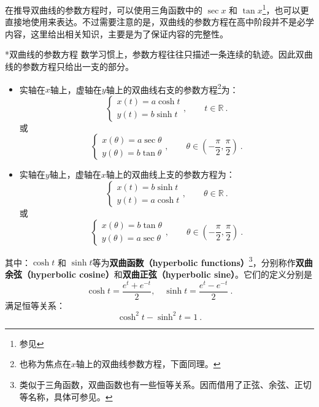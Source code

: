 在推导双曲线的参数方程时，可以使用三角函数中的 $\sec x$ 和 $\tan x$\footnote{参见}，也可以更直接地使用来表达。不过需要注意的是，双曲线的参数方程在高中阶段并不是必学内容，这里给出相关知识，主要是为了保证内容的完整性。

\begin{theorem}{*双曲线的参数方程}
数学习惯上，参数方程往往只描述一条连续的轨迹。因此双曲线的参数方程只给出一支的部分。
\begin{itemize}
\item 实轴在$x$轴上，虚轴在$y$轴上的双曲线右支的参数方程\footnote{也称为焦点在$x$轴上的双曲线参数方程，下面同理。}为：
\begin{equation}
\begin{cases}
x(t) = a \cosh t\\
y(t) = b \sinh t
\end{cases},\qquad t\in \mathbb{R} ~.
\end{equation}
或
\begin{equation}
\begin{cases}
x(\theta)=a\sec{\theta}\\
y(\theta)=b\tan{\theta}
\end{cases},\qquad \theta \in \left( -\frac{\pi}{2}, \frac{\pi}{2} \right) ~.
\end{equation}

\item 实轴在$y$轴上，虚轴在$x$轴上的双曲线上支的参数方程为：
\begin{equation}
\begin{cases}
x(t) = b \sinh t\\
y(t) = a \cosh t
\end{cases},\qquad \theta\in \mathbb{R} ~.
\end{equation}
或
\begin{equation}
\begin{cases}
x(\theta) = b \tan \theta\\
y(\theta) = a \sec \theta
\end{cases},\qquad \theta \in \left( -\frac{\pi}{2}, \frac{\pi}{2} \right) ~.
\end{equation}
\end{itemize}
其中：$\cosh t$ 和 $\sinh t$等为\textbf{双曲函数（hyperbolic functions）}\footnote{类似于三角函数，双曲函数也有一些恒等关系。因而借用了正弦、余弦、正切等名称，具体可参见。}，分别称作\textbf{双曲余弦（hyperbolic cosine）}和\textbf{双曲正弦（hyperbolic sine）}。它们的定义分别是
\begin{equation}
\cosh t = \frac{e^t + e^{-t}}{2}, \quad \sinh t = \frac{e^t - e^{-t}}{2}~.
\end{equation}
满足恒等关系：
\begin{equation}
\cosh^2 t - \sinh^2 t = 1~.
\end{equation}
\end{theorem}

